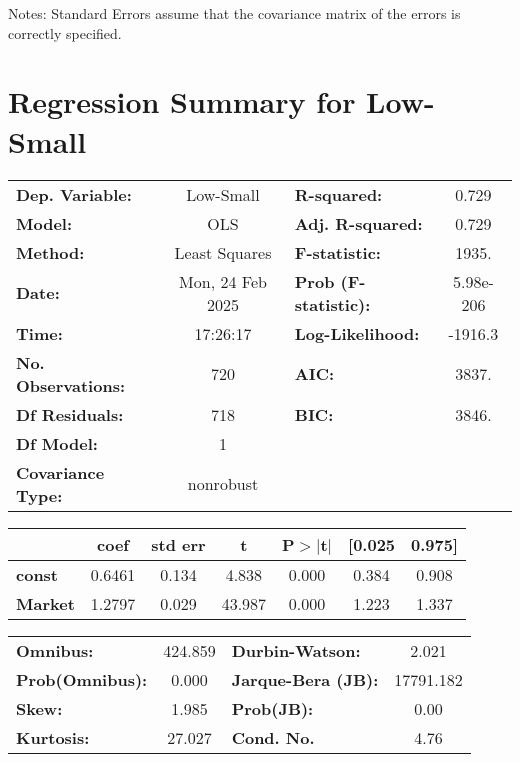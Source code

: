 \documentclass{article}
\begin{document}
Notes: \newline
 [1] Standard Errors assume that the covariance matrix of the errors is correctly specified.
\newpage
\section*{Regression Summary for Low-Small}
\begin{center}
\begin{tabular}{lclc}
\toprule
\textbf{Dep. Variable:}    &    Low-Small     & \textbf{  R-squared:         } &     0.729   \\
\textbf{Model:}            &       OLS        & \textbf{  Adj. R-squared:    } &     0.729   \\
\textbf{Method:}           &  Least Squares   & \textbf{  F-statistic:       } &     1935.   \\
\textbf{Date:}             & Mon, 24 Feb 2025 & \textbf{  Prob (F-statistic):} & 5.98e-206   \\
\textbf{Time:}             &     17:26:17     & \textbf{  Log-Likelihood:    } &   -1916.3   \\
\textbf{No. Observations:} &         720      & \textbf{  AIC:               } &     3837.   \\
\textbf{Df Residuals:}     &         718      & \textbf{  BIC:               } &     3846.   \\
\textbf{Df Model:}         &           1      & \textbf{                     } &             \\
\textbf{Covariance Type:}  &    nonrobust     & \textbf{                     } &             \\
\bottomrule
\end{tabular}
\begin{tabular}{lcccccc}
                & \textbf{coef} & \textbf{std err} & \textbf{t} & \textbf{P$> |$t$|$} & \textbf{[0.025} & \textbf{0.975]}  \\
\midrule
\textbf{const}  &       0.6461  &        0.134     &     4.838  &         0.000        &        0.384    &        0.908     \\
\textbf{Market} &       1.2797  &        0.029     &    43.987  &         0.000        &        1.223    &        1.337     \\
\bottomrule
\end{tabular}
\begin{tabular}{lclc}
\textbf{Omnibus:}       & 424.859 & \textbf{  Durbin-Watson:     } &     2.021  \\
\textbf{Prob(Omnibus):} &   0.000 & \textbf{  Jarque-Bera (JB):  } & 17791.182  \\
\textbf{Skew:}          &   1.985 & \textbf{  Prob(JB):          } &      0.00  \\
\textbf{Kurtosis:}      &  27.027 & \textbf{  Cond. No.          } &      4.76  \\
\bottomrule
\end{tabular}
\end{center}
\end{document}
